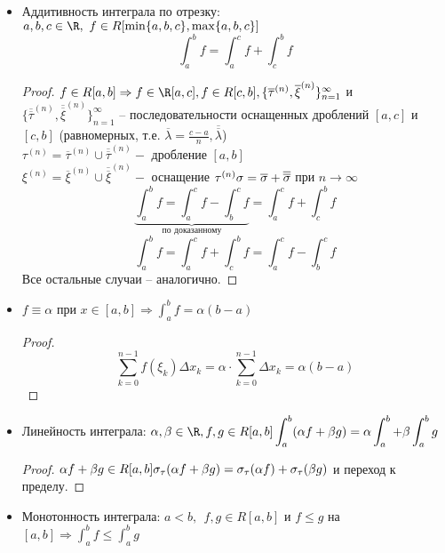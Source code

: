 \begin{itemize}
	\item Аддитивность интеграла по отрезку:\\ $a, b, c \in \R, \ f \in R [\min\{a, b, c\}, \max \{a, b, c\}]$
	\[\int_{a}^{b} f = \int_{a}^{c} f + \int_{c}^{b} f\]

	\begin{proof}
		$f\in R[a,b] \Rightarrow f \in \R[a,c], f \in R[c,b], \{\overline{\tau}^{(n)}, \overline{\xi}^{(n)}\}^{\infty}_{n=1}$ и $\{\overline{\overline{\tau}}^{(n)}, \overline{\overline{\xi}}^{(n)}\}^{\infty}_{n=1}$ --
		последовательности оснащенных дроблений $[a,c]$ и $[c,b]$  (равномерных, т.е. $\overline{\lambda} = \frac{c-a}{n}, \overline{\overline{\lambda}}$)\\
		$\tau^{(n)} = \overline{\tau}^{(n)} \cup \overline{\overline{\tau}}^{(n)} -$ дробление $[a,b]$\\
		$\xi^{(n)} = \overline{\xi}^{(n)} \cup \overline{\overline{\xi}}^{(n)} -$ оснащение $\tau^{(n)}\\
		\sigma = \overline{\sigma} + \overline{\overline{\sigma}}$ при $n \to \infty$\\
		\[\underbrace{\int_{a}^{b} f = \int_{a}^{c} f - \int_{b}^{c} f}_{\text{по доказанному}}  = \int_{a}^{c} f + \int_{c}^{b} f\]
		\[ \int_{a}^{b} f = \int_{a}^{c} f + \int_{c}^{b} f = \int_{a}^{c} f - \int_{b}^{c} f\]
		Все остальные случаи -- аналогично.
	\end{proof}

	\item $f \equiv \alpha$ при $\displaystyle x \in [a,b] \Rightarrow \int_{a}^{b} f = \alpha(b-a)$
	
	\begin{proof}
		\[\sum_{k=0}^{n-1} f(\xi_k) \Delta x_k = \alpha \cdot \sum_{k=0}^{n-1} \Delta x_k = \alpha (b-a)\]
	\end{proof}

	\item Линейность интеграла: $\alpha, \beta \in \R, f, g \in R[a,b]\\
	\displaystyle \int_{a}^{b} (\alpha f + \beta g) = \alpha \int_{a}^{b} + \beta \int_{a}^{b} g$

	\begin{proof}
		$\alpha f + \beta g \in R [a,b]\\
		\sigma_{\tau}(\alpha f + \beta g) = \sigma_{\tau}(\alpha f) + \sigma_{\tau} (\beta g)$ и переход к пределу.
	\end{proof}

	\item Монотонность интеграла: $a < b, \ \ f, g \in R[a,b]$ и $f \leqslant g$ на $\displaystyle [a,b] \Rightarrow \int_{a}^{b} f \leqslant \int_{a}^{b} g$


\end{itemize}
